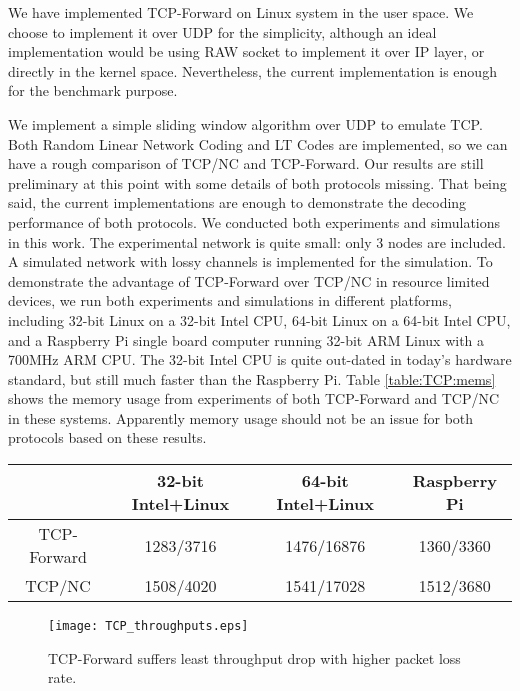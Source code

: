\documentclass[10pt, conference, final, letterpaper]{IEEEtran}
\theoremstyle{definition}
\begin{document}
We have implemented TCP-Forward on Linux system in the user space. We choose to implement it over UDP for the simplicity, although an ideal implementation would be using RAW socket to implement it over IP layer, or directly in the kernel space. Nevertheless, the current implementation is enough for the benchmark purpose.

We implement a simple sliding window algorithm over UDP to emulate TCP. Both Random Linear Network Coding and LT Codes are implemented, so we can have a rough comparison of TCP/NC and TCP-Forward. Our results are still preliminary at this point with some details of both protocols missing. That being said, the current implementations are enough to demonstrate the decoding performance of both protocols. We conducted both experiments and simulations in this work. The experimental network is quite small: only 3 nodes are included. A simulated network with lossy channels is implemented for the simulation. To demonstrate the advantage of TCP-Forward over TCP/NC in resource limited devices, we run both experiments and simulations in different platforms, including 32-bit Linux on a 32-bit Intel CPU, 64-bit Linux on a 64-bit Intel CPU, and a Raspberry Pi \cite{rpi} single board computer running 32-bit ARM Linux with a 700MHz ARM CPU. The 32-bit Intel CPU is quite out-dated in today's hardware standard, but still much faster than the Raspberry Pi. Table \ref{table:TCP:mems} shows the memory usage from experiments of both TCP-Forward and TCP/NC in these systems. Apparently memory usage should not be an issue for both protocols based on these results.

\begin{table*}[bht]
	\centering
\caption{System Memory Usage (RSS/VM Size in bytes) of TCP-Forward and TCP/NC}
\begin{tabular}{|c|c|c|c|} \hline
	&32-bit Intel+Linux &64-bit Intel+Linux &Raspberry Pi\\ \hline
	TCP-Forward&1283/3716&1476/16876&1360/3360\\ \hline
	TCP/NC&1508/4020&1541/17028&1512/3680 \\ \hline
\end{tabular}
\label{table:TCP:mems}
\end{table*}

\begin{figure}[htb]
	\begin{center}
		\texttt{[image: TCP\_throughputs.eps]}
	\end{center}
	\caption{TCP-Forward suffers least throughput drop with higher packet loss rate.}
	\label{fig:tcpforward:throughputs}
\end{figure}
\end{document}
